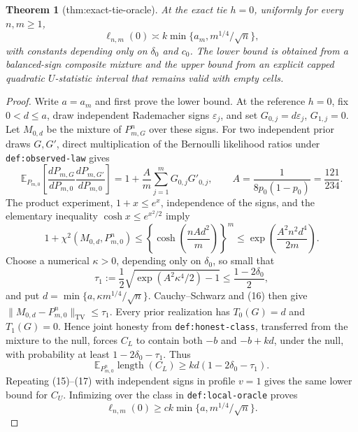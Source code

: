 \documentclass{article}
\newtheorem{theorem}{Theorem}
\begin{document}
\begin{theorem}[thm:exact-tie-oracle]\label{thm:exact-tie-oracle}
At the exact tie \(h=0\), uniformly for every \(n,m\ge1\), \[\ell_{n,m}(0)\asymp k\min\{a_m,m^{1/4}/\sqrt n\},\] with constants depending only on \(\delta_0\) and \(c_0\). The lower bound is obtained from a balanced-sign composite mixture and the upper bound from an explicit capped quadratic \(U\)-statistic interval that remains valid with empty cells.
\end{theorem}
\begin{proof}
Write \(a=a_m\) and first prove the lower bound.  At the reference \(h=0\),
fix \(0<d\le a\), draw independent Rademacher signs \(\varepsilon_j\), and
set \(G_{0,j}=d\varepsilon_j\), \(G_{1,j}=0\).  Let \(M_{0,d}\) be the
mixture of \(P_{m,G}^n\) over these signs.  For two independent prior draws
\(G,G'\), direct multiplication of the Bernoulli likelihood ratios under
\texttt{def:observed-law} gives
\[
 \mathbb E_{P_{m,0}}
 \left[\frac{dP_{m,G}}{dP_{m,0}}
       \frac{dP_{m,G'}}{dP_{m,0}}\right]
 =1+\frac{A}{m}\sum_{j=1}^mG_{0,j}G'_{0,j},
 \qquad A=\frac1{8p_0(1-p_0)}=\frac{121}{234}.                           \tag{15}
\]
The product experiment, \(1+x\le e^x\), independence of the signs, and
the elementary inequality \(\cosh x\le e^{x^2/2}\) imply
\[
 1+\chi^2(M_{0,d},P_{m,0}^n)
 \le\left\{\cosh\left(\frac{nAd^2}{m}\right)\right\}^{m}
 \le\exp\left(\frac{A^2n^2d^4}{2m}\right).                              \tag{16}
\]
Choose a numerical \(\kappa>0\), depending only on \(\delta_0\), so small
that
\[
 \tau_1:=\frac12\sqrt{\exp(A^2\kappa^4/2)-1}
 \le\frac{1-2\delta_0}{2},
\]
and put \(d=\min\{a,\kappa m^{1/4}/\sqrt n\}\).  Cauchy--Schwarz and (16)
then give \(\|M_{0,d}-P_{m,0}^n\|_{\mathrm{TV}}\le\tau_1\).
Every prior realization has \(T_0(G)=d\) and \(T_1(G)=0\).  Hence joint
honesty from \texttt{def:honest-class}, transferred from the mixture to the
null, forces \(C_L\) to contain both \(-b\) and \(-b+kd\), under the null,
with probability at least \(1-2\delta_0-\tau_1\).  Thus
\[
 \mathbb E_{P_{m,0}^n}\operatorname{length}(C_L)
 \ge kd(1-2\delta_0-\tau_1).                                             \tag{17}
\]
Repeating (15)--(17) with independent signs in profile \(v=1\) gives the
same lower bound for \(C_U\).  Infimizing over the class in
\texttt{def:local-oracle} proves
\[
 \ell_{n,m}(0)\ge c k\min\{a,m^{1/4}/\sqrt n\}.                           \tag{18}
\]


\end{proof}
\end{document}
